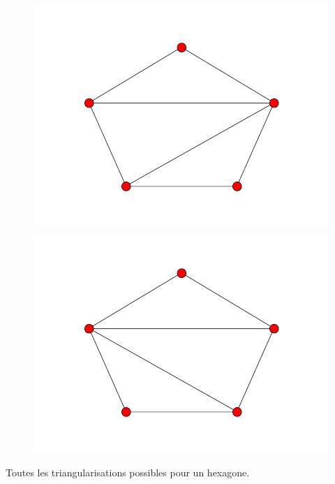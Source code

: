 \documentclass[fontsize=10pt]{article}
\begin{document}
\begin{enumerate}
\begin{figure}[hbtp]
\includegraphics[scale=0.1]{imgs/pentagon/pentagon_4.png}
\includegraphics[scale=0.1]{imgs/pentagon/pentagon_5.png}
\end{figure}

Toutes les triangularisations possibles pour un hexagone.


\end{enumerate}
\end{document}
